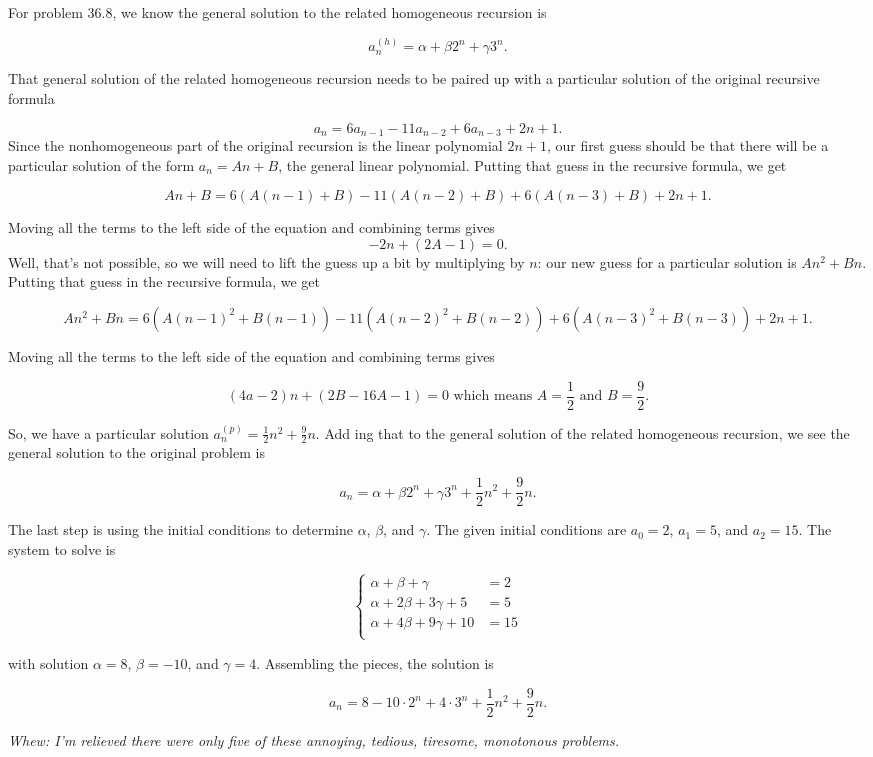 \begin{Solution}{37.5}

For problem 36.8, we know the general solution to the related homogeneous recursion is

\[
a_n^{(h)} = \alpha +\beta 2^n +\gamma 3^n.
\]

That general solution  of the related homogeneous recursion needs to be paired up with a particular solution of the original 
recursive formula

\[
a_n = 6a_{n-1} - 11a_{n-2}+ 6a_{n-3} + 2n+1.
\]
Since the nonhomogeneous part of the original recursion is the linear polynomial $2n+1$, our first guess should be that there
will be a particular solution of the form $a_n = An+B$, the general linear polynomial.  Putting that guess in the recursive formula, we get

\[
An+B = 6(A(n-1)+B) - 11(A(n-2)+B) + 6(A(n-3) +B) + 2n + 1.
\]

Moving all the terms to the left side of the equation  and combining terms gives
\[
-2n + (2A-1) = 0.
\]
Well, that's not possible, so we will need to lift the guess up a bit by multiplying by $n$: our new guess for a particular solution is $An^{2} + Bn$. Putting that guess in the recursive formula, we get

\[
An^{2}+Bn = 6(A(n-1)^{2}+B(n-1)) - 11(A(n-2)^{2}+B(n-2)) + 6(A(n-3)^{2} +B(n-3)) + 2n + 1.
\]

Moving all the terms to the left side of the equation  and combining terms gives

\[
(4a-2)n + (2B-16A - 1) = 0 \text{ which means } A= \frac{1}{2} \text{ and } B = \frac{9}{2}.
\]

So, we have a particular solution $a_{n}^{(p)} = \frac{1}{2}n^{2} + \frac{9}{2} n$.  Add ing that to the general solution of the related homogeneous recursion, we see the general solution to the original problem is
 
 \[
 a_{n} = \alpha +\beta  2^n + \gamma 3^{n}+ \frac{1}{2}n^{2} + \frac{9}{2}n.
 \]
 
 The last step is using the initial conditions to determine $\alpha$, $\beta$, and $\gamma$. The given initial conditions are $a_0 = 2$, $a_1 = 5$, and $a_2 = 15$. The system to solve is

\[
  \left\{
    \begin{aligned}
     \alpha   + \beta  + \gamma  &= 2\\
     \alpha + 2\beta +3\gamma + 5 &= 5\\
     \alpha + 4\beta +9\gamma + 10 &= 15\\
     \end{aligned}
   \right.
\]

with solution $\alpha = 8$, $\beta = -10$, and $\gamma = 4$.  Assembling the pieces,  the solution is

\[
a_n = 8 -10\cdot 2^{n}  + 4\cdot 3^{n} + \frac{1}{2}n^{2} + \frac{9}{2}n.
\]

{\it Whew: I'm relieved  there were only five of these annoying, tedious, tiresome, monotonous  problems.}
 
\end{Solution}

